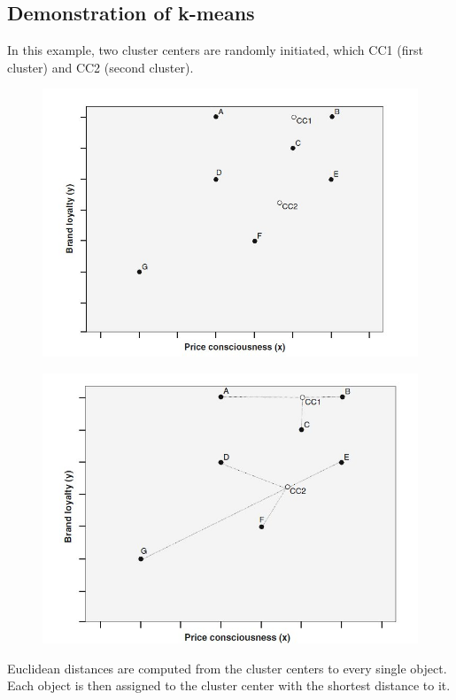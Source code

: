 \documentclass[a4paper,12pt]{article}
\begin{document}
\subsection{Demonstration of k-means}
In this example, two cluster centers are randomly
initiated, which CC1 (first cluster) and CC2 (second cluster).
\begin{figure}[h!]
	\begin{center}
		\includegraphics[scale=0.4]{images/kmeans1.jpg}\\
	\end{center}
\end{figure}
\begin{figure}[h!]
	\begin{center}
		\includegraphics[scale=0.4]{images/kmeans2.jpg}\\
	\end{center}
\end{figure}
Euclidean distances are computed from the cluster
centers to every single object. Each object is then assigned to the cluster center with
the shortest distance to it.
\end{document}
